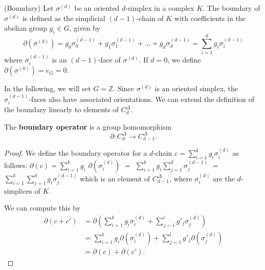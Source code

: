 \begin{definition}
	{(Boundary) \cite[p.106]{hatcher2005algebraic}} Let $\sigma^{(d)}$ be an oriented
	$d$-simplex in a complex $K$. The boundary of $\sigma^{(d)}$ is defined as the
	simplicial $(d-1)$-chain of $K$ with coefficients in the abelian group
	$g_{i} \in G$, given by
	\begin{equation}
		\partial(\sigma^{(d)}) = g_{0} \sigma^{(d-1)}_{0} + g_{1} \sigma^{(d-1)}_{1}
		+ \ldots + g_{d} \sigma^{(d-1)}_{d} = \sum_{i=1}^{d}g_{i} \sigma^{(d-1)}_{i}
	\end{equation}
	where $\sigma^{(d-1)}_{i}$ is an $(d-1)$-face of $\sigma^{(d)}$. If $d=0$, we define
	$\partial(\sigma^{(0)}) = e_{G} = 0$.
\end{definition}

In the following, we will set $G = \mathbb{Z}$. Since $\sigma^{(d)}$ is an oriented
simplex, the $\sigma^{(d-1)}_{i}$-faces also have associated orientations. We can
extend the definition of the boundary linearly to elements of $C^{\Delta}_{d}$.

\begin{lemma}
	The \textbf{boundary operator} is a group homomorphism
	\[
		\partial: C^{\Delta}_{d} \rightarrow C^{\Delta}_{d-1}.
	\]
\end{lemma}
\begin{proof}
	We define the boundary operator for a $d$-chain $c = \sum_{i=1}^{k}g_{i} \sigma
	_{i}^{(d)}$ as follows: $\partial(c) = \sum_{i=1}^{k}g_{i}$
	$\partial(\sigma_{i}^{(d)})$ $=$
	$\sum_{i=1}^{k}g_{i} \sum_{j=1}^{d}\sigma_{j}^{(d-1)}$ $=$
	$\sum_{i=1}^{k}\sum_{j=1}^{d}g_{i} \sigma_{j}^{(d-1)}$ which is an element of
	$C^{\Delta}_{d-1}$, where $\sigma_{i}^{(d)}$ are the $d$-simplices of $K$.

	We can compute this by
	\begin{align}
		\partial(c + c') & = \partial(\sum_{i=1}^{k}g_{i} \sigma_{i}^{(d)}+ \sum_{j=1}^{l}g'_{j} \sigma_{j}^{(d)})            \\
		                 & = \sum_{i=1}^{k}g_{i} \partial(\sigma_{i}^{(d)}) + \sum_{j=1}^{l}g'_{j} \partial(\sigma_{j}^{(d)}) \\
		                 & = \partial(c) + \partial(c').
	\end{align}
\end{proof}

